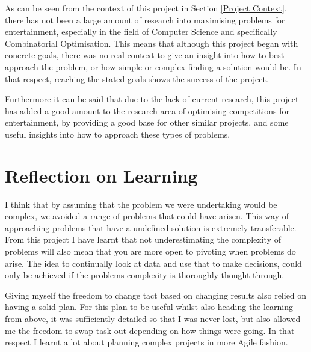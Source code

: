\documentclass[12pt]{report}
\begin{document}
As can be seen from the context of this project in Section \ref{Project Context}, there has not been a large amount of research into maximising problems for entertainment, especially in the field of Computer Science and specifically Combinatorial Optimisation. This means that although this project began with concrete goals, there was no real context to give an insight into how to best approach the problem, or how simple or complex finding a solution would be. In that respect, reaching the stated goals shows the success of the project. 

Furthermore it can be said that due to the lack of current research, this project has added a good amount to the research area of optimising competitions for entertainment, by providing a good base for other similar projects, and some useful insights into how to approach these types of problems.

\section{Reflection on Learning}\label{Reflection}

I think that by assuming that the problem we were undertaking would be complex, we avoided a range of problems that could have arisen. This way of approaching problems that have a undefined solution is extremely transferable. From this project I have learnt that not underestimating the complexity of problems will also mean that you are more open to pivoting when problems do arise. The idea to continually look at data and use that to make decisions, could only be achieved if the problems complexity is thoroughly thought through.

Giving myself the freedom to change tact based on changing results also relied on having a solid plan. For this plan to be useful whilst also heading the learning from above, it was sufficiently detailed so that I was never lost, but also allowed me the freedom to swap task out depending on how things were going. In that respect I learnt a lot about planning complex projects in more Agile fashion.
\end{document}
